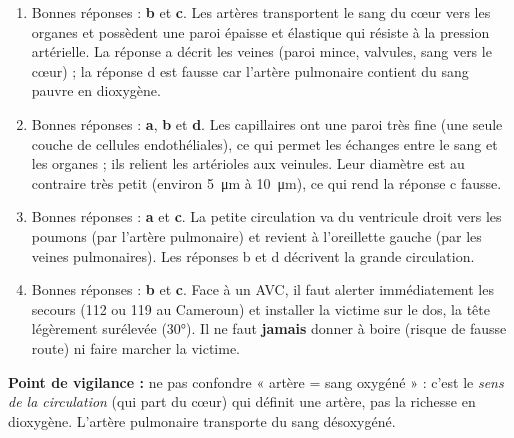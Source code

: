 \documentclass[11pt]{article}
\newcommand{\cle}[1]{{\popxbold\color{popdark}#1}}
\begin{document}
\begin{corrige}
\begin{enumerate}
\item Bonnes réponses : \textbf{b} et \textbf{c}. Les artères transportent le sang du \cle{cœur} vers les organes et possèdent une paroi épaisse et élastique qui résiste à la pression artérielle. La réponse a décrit les veines (paroi mince, valvules, sang vers le cœur) ; la réponse d est fausse car l'artère pulmonaire contient du sang pauvre en \cle{dioxygène}.
\item Bonnes réponses : \textbf{a}, \textbf{b} et \textbf{d}. Les capillaires ont une paroi très fine (une seule couche de cellules endothéliales), ce qui permet les échanges entre le sang et les organes ; ils relient les artérioles aux veinules. Leur diamètre est au contraire très petit (environ \SI{5}{\micro\meter} à \SI{10}{\micro\meter}), ce qui rend la réponse c fausse.
\item Bonnes réponses : \textbf{a} et \textbf{c}. La \cle{petite circulation} va du ventricule droit vers les poumons (par l'artère pulmonaire) et revient à l'oreillette gauche (par les veines pulmonaires). Les réponses b et d décrivent la \cle{grande circulation}.
\item Bonnes réponses : \textbf{b} et \textbf{c}. Face à un \cle{AVC}, il faut alerter immédiatement les secours (112 ou 119 au Cameroun) et installer la victime sur le dos, la tête légèrement surélevée (30°). Il ne faut \textbf{jamais} donner à boire (risque de fausse route) ni faire marcher la victime.
\end{enumerate}
\textbf{Point de vigilance :} ne pas confondre « artère = sang oxygéné » : c'est le \emph{sens de la circulation} (qui part du cœur) qui définit une artère, pas la richesse en dioxygène. L'artère pulmonaire transporte du sang désoxygéné.
\end{corrige}
\end{document}
